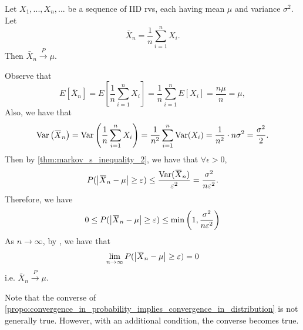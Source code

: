 \documentclass[notoc,notitlepage]{tufte-book}
\newcommand{\convp}{\overset{P}{\to}}
\begin{document}
\begin{eg}\label{eg:weak_law_of_large_numbers}\label{eg:bernoulli_s_theorem}
  Let $X_1, ..., X_n, ...$ be a sequence of IID rvs, each having mean $\mu$ and variance $\sigma^2$. Let
  \begin{equation*}
    \bar{X}_n = \frac{1}{n} \sum_{i=1}^{n} X_i.
  \end{equation*}
  Then $\bar{X}_n \convp \mu$.
\end{eg}

\begin{solution}
  Observe that
  \begin{equation*}
    E\left[\bar{X}_n\right] = E\left[ \frac{1}{n} \sum_{i=1}^{n} X_i \right] = \frac{1}{n} \sum_{i=1}^{n} E[X_i] = \frac{n \mu}{n} = \mu,
  \end{equation*}
  Also, we have that
  \begin{equation*}
    \Var\left( \bar{X}_n \right) = \Var\left( \frac{1}{n} \sum_{i=1}^{n} X_i \right) = \frac{1}{n^2} \sum_{i=1}^{n} \Var(X_i) = \frac{1}{n^2} \cdot n \sigma^2 = \frac{\sigma^2}{2}.
  \end{equation*}
  Then by \cref{thm:markov_s_inequality_2}, we have that $\forall \epsilon > 0$,
  \begin{equation*}
    P(\abs{\bar{X}_n - \mu} \geq \epsilon) \leq \frac{\Var(\bar{X}_n)}{\epsilon^2} = \frac{\sigma^2}{n \epsilon^2}.
  \end{equation*}
  Therefore, we have
  \begin{equation*}
    0 \leq P(\abs{\bar{X}_n - \mu} \geq \epsilon) \leq \min\left( 1, \frac{\sigma^2}{n \epsilon^2} \right)
  \end{equation*}
  As $n \to \infty$, by , we have that
  \begin{equation*}
    \lim_{n \to \infty} P(\abs{\bar{X}_n - \mu} \geq \epsilon) = 0
  \end{equation*}
  i.e. $\bar{X}_n \convp \mu$.
\end{solution}

Note that the converse of \cref{propo:convergence_in_probability_implies_convergence_in_distribution} is not generally true.  However, with an additional condition, the converse becomes true.
\end{document}
